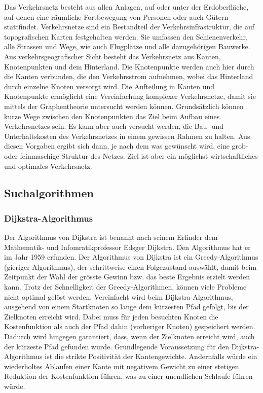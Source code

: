 \label{section:verkehr/einfuehrung}

Das Verkehrsnetz besteht aus allen Anlagen, auf oder unter der Erdoberfläche, auf denen eine räumliche Fortbewegung von Personen oder auch Gütern stattfindet. Verkehrsnetze sind ein Bestandteil der Verkehrsinfrastruktur, die auf topografischen Karten festgehalten werden. Sie umfassen den Schienenverkehr, alle Strassen und Wege, wie auch Flugplätze und alle dazugehörigen Bauwerke.
Aus verkehrsgeografischer Sicht besteht das Verkehrsnetz aus Kanten, Knotenpunkten und dem Hinterland. Die Knotenpunkte werden auch hier durch die Kanten verbunden, die den Verkehrsstrom aufnehmen, wobei das Hinterland durch einzelne Knoten versorgt wird. Die Aufteilung in Kanten und Knotenpunkte ermöglicht eine Vereinfachung komplexer Verkehrsnetze, damit sie mittels der Graphentheorie untersucht werden können.
Grundsätzlich können kurze Wege zwischen den Knotenpunkten das Ziel beim Aufbau eines Verkehrsnetzes sein. Es kann aber auch versucht werden, die Bau- und Unterhaltskosten des Verkehrsnetzes in einem gewissen Rahmen zu halten. Aus diesen Vorgaben ergibt sich dann, je nach dem was gewünscht wird, eine grob- oder feinmaschige Struktur des Netzes.
Ziel ist aber ein möglichst wirtschaftliches und optimales Verkehrsnetz.

\subsection{Suchalgorithmen}

\subsubsection{Dijkstra-Algorithmus}
Der Algorithmus von Dijkstra ist benannt nach seinem Erfinder dem Mathematik- und Infomratikprofessor Edsger Dijkstra. Den Algorithmus hat er im Jahr 1959 erfunden.
Der Algorithmus von Dijkstra ist ein Greedy-Algorithmus (gieriger Algorithmus), der schrittweise einen Folgezustand auswählt, damit beim Zeitpunkt der Wahl der grösste Gewinn bzw. das beste Ergebnis erzielt werden kann.
Trotz der Schnelligkeit der Greedy-Algorithmen, können viele Probleme nicht optimal gelöst werden.
Vereinfacht wird beim Dijkstra-Algorithmus, ausgehend von einem Startknoten so lange dem kürzesten Pfad gefolgt, bis der Zielknoten erreicht wird. Dabei muss für jeden besuchten Knoten die Kostenfunktion als auch der Pfad dahin (vorheriger Knoten) gespeichert werden.
Dadurch wird hingegen garantiert, dass, wenn der Zielknoten erreicht wird, auch der kürzeste Pfad gefunden wurde.
Grundlegende Voraussetzung für den Dijkstra-Algorithmus ist die strikte Positivität der Kantengewichte. Andernfalls würde ein wiederholtes Ablaufen einer Kante mit negativem Gewicht zu einer stetigen Reduktion der Kostenfunktion führen, was zu einer unendlichen Schlaufe führen würde.

